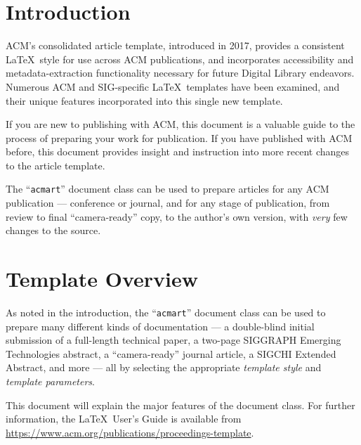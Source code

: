 \documentclass[manuscript,screen,review]{acmart}
\begin{document}
\maketitle

\setlength{\parskip}{-0.1pt}

\hypertarget{introduction}{%
\section{Introduction}\label{introduction}}

ACM's consolidated article template, introduced in 2017, provides a
consistent \LaTeX~style for use across ACM publications, and
incorporates accessibility and metadata-extraction functionality
necessary for future Digital Library endeavors. Numerous ACM and
SIG-specific \LaTeX~templates have been examined, and their unique
features incorporated into this single new template.

If you are new to publishing with ACM, this document is a valuable guide
to the process of preparing your work for publication. If you have
published with ACM before, this document provides insight and
instruction into more recent changes to the article template.

The ``\texttt{acmart}'' document class can be used to prepare articles
for any ACM publication --- conference or journal, and for any stage of
publication, from review to final ``camera-ready'' copy, to the author's
own version, with \emph{very} few changes to the source.

\hypertarget{template-overview}{%
\section{Template Overview}\label{template-overview}}

As noted in the introduction, the ``\texttt{acmart}'' document class can
be used to prepare many different kinds of documentation --- a
double-blind initial submission of a full-length technical paper, a
two-page SIGGRAPH Emerging Technologies abstract, a ``camera-ready''
journal article, a SIGCHI Extended Abstract, and more --- all by
selecting the appropriate \emph{template style} and \emph{template
parameters}.

This document will explain the major features of the document class. For
further information, the \LaTeX~User's Guide is available from
\url{https://www.acm.org/publications/proceedings-template}.
\end{document}
